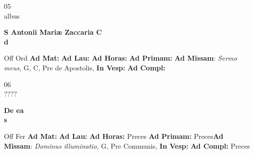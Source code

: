 \documentclass[10pt, openany]{book}
\begin{document}
    \begin{center}
        \begin{minipage}{3.5in}
            \vspace{2em}
            \begin{minipage}{0.5in}
                {\Huge 05} \\
                {\normalsize albus}
            \end{minipage}
            \begin{minipage}{3.0in}
                \textbf{ \large S Antonii Mariæ Zaccaria C \\
                \textnormal{\normalsize d}}

            \end{minipage}
            \begin{justify}Off Ord
                \textbf{Ad Mat: }
                \textbf{Ad Lau: }
                \textbf{Ad Horas: }
                \textbf{Ad Primam: }\textbf{Ad Missam}: \textit{Sermo meus,} G, C, Pre de Apostolis, 
                \textbf{In Vesp: }
                \textbf{Ad Compl: }
            \end{justify}
        \end{minipage}
    \end{center}

    \begin{center}
        \begin{minipage}{3.5in}
            \vspace{2em}
            \begin{minipage}{0.5in}
                {\Huge 06} \\
                {\normalsize ????}
            \end{minipage}
            \begin{minipage}{3.0in}
                \textbf{ \large De ea \\
                \textnormal{\normalsize s}}

            \end{minipage}
            \begin{justify}Off Fer
                \textbf{Ad Mat: }
                \textbf{Ad Lau: }
                \textbf{Ad Horas: }Preces
                \textbf{Ad Primam: }Preces\textbf{Ad Missam}: \textit{Dominus illuminatio,} G, Pre Communis, 
                \textbf{In Vesp: }
                \textbf{Ad Compl: }Preces
            \end{justify}
        \end{minipage}
    \end{center}
\end{document}
